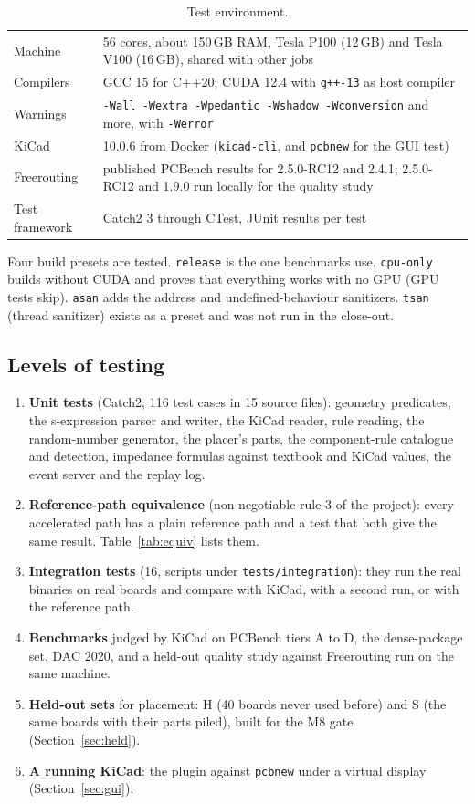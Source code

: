 \documentclass[10pt,a4paper]{article}
\newcommand{\code}[1]{\texttt{#1}}
\begin{document}
\begin{table}[H]
\centering\small
\begin{tabular}{@{}ll@{}}
\toprule
Machine & 56 cores, about 150\,GB RAM, Tesla P100 (12\,GB) and Tesla V100 (16\,GB), shared with other jobs \\
Compilers & GCC 15 for C++20; CUDA 12.4 with \code{g++-13} as host compiler \\
Warnings & \code{-Wall -Wextra -Wpedantic -Wshadow -Wconversion} and more, with \code{-Werror} \\
KiCad & 10.0.6 from Docker (\code{kicad-cli}, and \code{pcbnew} for the GUI test) \\
Freerouting & published PCBench results for 2.5.0-RC12 and 2.4.1; 2.5.0-RC12 and 1.9.0 run locally for the quality study \\
Test framework & Catch2 3 through CTest, JUnit results per test \\
\bottomrule
\end{tabular}
\caption{Test environment.}
\end{table}

\noindent Four build presets are tested. \code{release} is the one benchmarks use. \code{cpu-only} builds without
CUDA and proves that everything works with no GPU (GPU tests skip). \code{asan} adds the address and
undefined-behaviour sanitizers. \code{tsan} (thread sanitizer) exists as a preset and was not run in the
close-out.

\subsection{Levels of testing}

\begin{enumerate}
\item \textbf{Unit tests} (Catch2, 116 test cases in 15 source files): geometry predicates, the s-expression
  parser and writer, the KiCad reader, rule reading, the random-number generator, the placer's parts, the
  component-rule catalogue and detection, impedance formulas against textbook and KiCad values, the event server
  and the replay log.
\item \textbf{Reference-path equivalence} (non-negotiable rule 3 of the project): every accelerated path has a
  plain reference path and a test that both give the same result. Table~\ref{tab:equiv} lists them.
\item \textbf{Integration tests} (16, scripts under \code{tests/integration}): they run the real binaries on real
  boards and compare with KiCad, with a second run, or with the reference path.
\item \textbf{Benchmarks} judged by KiCad on PCBench tiers A to D, the dense-package set, DAC 2020, and a
  held-out quality study against Freerouting run on the same machine.
\item \textbf{Held-out sets} for placement: H (40 boards never used before) and S (the same boards with their parts
  piled), built for the M8 gate (Section~\ref{sec:held}).
\item \textbf{A running KiCad}: the plugin against \code{pcbnew} under a virtual display
  (Section~\ref{sec:gui}).
\end{enumerate}
\end{document}
